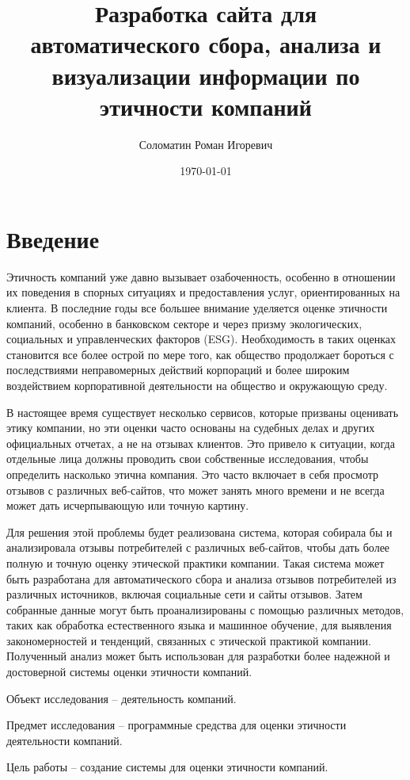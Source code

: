 \documentclass[PI, VKR]{HSEUniversity}
\author{Соломатин Роман Игоревич}
\date{\today}
\title{Разработка сайта для автоматического сбора, анализа и визуализации информации по этичности компаний}
\begin{document}
\maketitle

\chapter*{Введение}
\label{sec:orgc051ab8}
Этичность компаний уже давно вызывает озабоченность, особенно в отношении их поведения в спорных ситуациях и предоставления услуг, ориентированных на клиента. В последние годы все большее внимание уделяется оценке этичности компаний\autocite{mure_esg_2021}, особенно в банковском секторе и через призму экологических, социальных и управленческих факторов (ESG). Необходимость в таких оценках становится все более острой по мере того, как общество продолжает бороться с последствиями неправомерных действий корпораций и более широким воздействием корпоративной деятельности на общество и окружающую среду.

В настоящее время существует несколько сервисов, которые призваны оценивать этику компании, но эти оценки часто основаны на судебных делах и других официальных отчетах, а не на отзывах клиентов. Это привело к ситуации, когда отдельные лица должны проводить свои собственные исследования, чтобы определить насколько этична компания. Это часто включает в себя просмотр отзывов с различных веб-сайтов, что может занять много времени и не всегда может дать исчерпывающую или точную картину.

Для решения этой проблемы будет реализована система, которая собирала бы и анализировала отзывы потребителей с различных веб-сайтов, чтобы дать более полную и точную оценку этической практики компании. Такая система может быть разработана для автоматического сбора и анализа отзывов потребителей из различных источников, включая социальные сети и сайты отзывов. Затем собранные данные могут быть проанализированы с помощью различных методов, таких как обработка естественного языка и машинное обучение, для выявления закономерностей и тенденций, связанных с этической практикой компании. Полученный анализ может быть использован для разработки более надежной и достоверной системы оценки этичности компаний.

Объект исследования – деятельность компаний.

Предмет исследования – программные средства для оценки этичности деятельности компаний.

Цель работы – создание системы для оценки этичности компаний.
\end{document}
